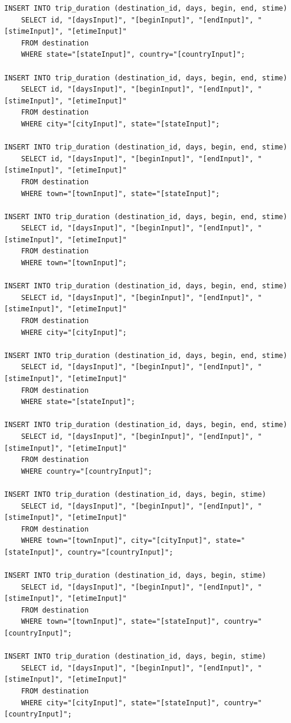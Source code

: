 \documentclass[letterpaper,10pt,onecolumn,compsoc]{IEEEtran}
\begin{document}
\begin{verbatim}
INSERT INTO trip_duration (destination_id, days, begin, end, stime) 
	SELECT id, "[daysInput]", "[beginInput]", "[endInput]", "[stimeInput]", "[etimeInput]" 
	FROM destination 
	WHERE state="[stateInput]", country="[countryInput]";
	
INSERT INTO trip_duration (destination_id, days, begin, end, stime) 
	SELECT id, "[daysInput]", "[beginInput]", "[endInput]", "[stimeInput]", "[etimeInput]" 
	FROM destination 
	WHERE city="[cityInput]", state="[stateInput]";
	
INSERT INTO trip_duration (destination_id, days, begin, end, stime) 
	SELECT id, "[daysInput]", "[beginInput]", "[endInput]", "[stimeInput]", "[etimeInput]" 
	FROM destination 
	WHERE town="[townInput]", state="[stateInput]";
	
INSERT INTO trip_duration (destination_id, days, begin, end, stime) 
	SELECT id, "[daysInput]", "[beginInput]", "[endInput]", "[stimeInput]", "[etimeInput]" 
	FROM destination 
	WHERE town="[townInput]";
	
INSERT INTO trip_duration (destination_id, days, begin, end, stime) 
	SELECT id, "[daysInput]", "[beginInput]", "[endInput]", "[stimeInput]", "[etimeInput]" 
	FROM destination 
	WHERE city="[cityInput]";
	
INSERT INTO trip_duration (destination_id, days, begin, end, stime) 
	SELECT id, "[daysInput]", "[beginInput]", "[endInput]", "[stimeInput]", "[etimeInput]" 
	FROM destination 
	WHERE state="[stateInput]";
	
INSERT INTO trip_duration (destination_id, days, begin, end, stime) 
	SELECT id, "[daysInput]", "[beginInput]", "[endInput]", "[stimeInput]", "[etimeInput]" 
	FROM destination 
	WHERE country="[countryInput]";
	
INSERT INTO trip_duration (destination_id, days, begin, stime) 
	SELECT id, "[daysInput]", "[beginInput]", "[endInput]", "[stimeInput]", "[etimeInput]" 
	FROM destination 
	WHERE town="[townInput]", city="[cityInput]", state="[stateInput]", country="[countryInput]";
	
INSERT INTO trip_duration (destination_id, days, begin, stime) 
	SELECT id, "[daysInput]", "[beginInput]", "[endInput]", "[stimeInput]", "[etimeInput]" 
	FROM destination 
	WHERE town="[townInput]", state="[stateInput]", country="[countryInput]";
	
INSERT INTO trip_duration (destination_id, days, begin, stime) 
	SELECT id, "[daysInput]", "[beginInput]", "[endInput]", "[stimeInput]", "[etimeInput]" 
	FROM destination 
	WHERE city="[cityInput]", state="[stateInput]", country="[countryInput]";
	

\end{verbatim}
\end{document}
